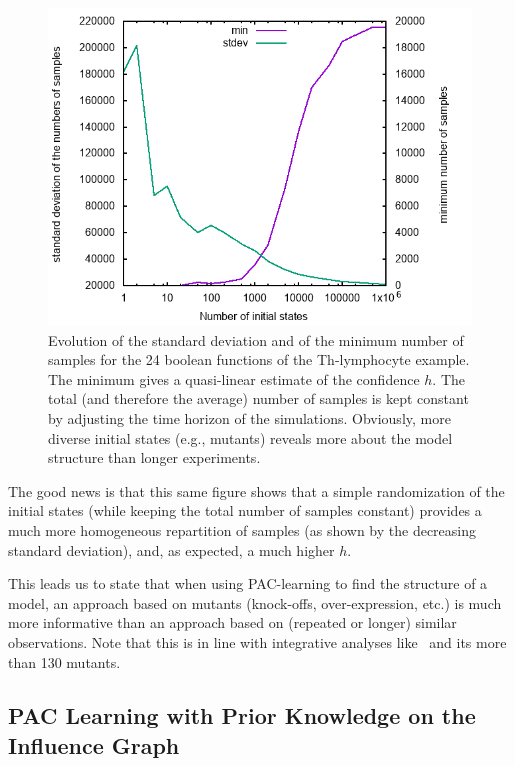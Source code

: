 \documentclass{llncs}
\begin{document}
\begin{figure}[htb]
   \includegraphics[width=\textwidth]{statistics/statistics.png}
   \caption{Evolution of the standard deviation and of the minimum number of
   samples for the 24 boolean functions of the Th-lymphocyte example. The
minimum gives a quasi-linear estimate of the confidence $h$. The total (and
therefore the average) number of samples is kept constant by adjusting the
time horizon of the simulations. Obviously, more diverse initial states (e.g.,
mutants) reveals more about the model structure than longer experiments.}%
\label{fig:statistics}
\end{figure}

The good news is that this same figure shows that a simple randomization of
the initial states (while keeping the total number of samples constant)
provides a much more homogeneous repartition of samples (as shown by the
decreasing standard deviation), and, as expected, a much higher $h$.

This leads us to state that when using PAC-learning to find the structure of a
model, an approach based on mutants (knock-offs, over-expression, etc.) is
much more informative than an approach based on (repeated or longer) similar
observations. Note that this is in line with integrative analyses
like~\cite{CCCCNT04mbc} and its more than 130 mutants.


\subsection{PAC Learning with Prior Knowledge on the Influence Graph}
\label{sec:prior}
\end{document}
